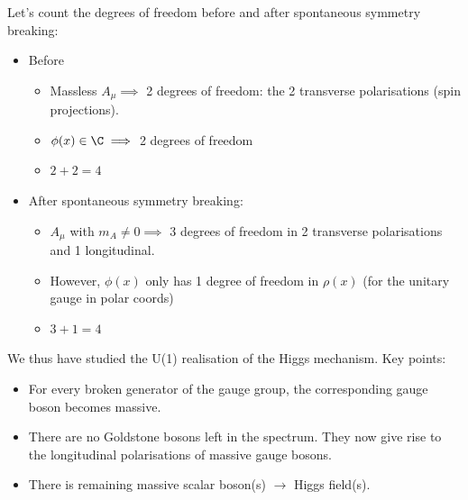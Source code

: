 \documentclass[a4paper, 11pt, normalem]{report}
\begin{document}
Let's count the degrees of freedom before and after spontaneous symmetry breaking:
\begin{itemize}
    \item Before
        \begin{itemize}
            \item Massless $A_\mu\implies$ 2 degrees of freedom: the 2 transverse polarisations (spin projections).
            \item $\phi(x)\in\C\implies$ 2 degrees of freedom
            \item $2+2=4$
        \end{itemize}
    \item After spontaneous symmetry breaking:
        \begin{itemize}
            \item $A_\mu$ with $m_A\neq0\implies$ 3 degrees of freedom in 2 transverse polarisations and 1 longitudinal.
            \item However, $\phi(x)$ only has 1 degree of freedom in $\rho(x)$ (for the unitary gauge in polar coords)
            \item $3+1=4$
        \end{itemize}
\end{itemize}
We thus have studied the U(1) realisation of the Higgs mechanism.
Key points:
\begin{itemize}
    \item For every broken generator of the gauge group, the corresponding gauge boson becomes massive.
    \item There are no Goldstone bosons left in the spectrum. They now give rise to the longitudinal polarisations of massive gauge bosons.
    \item There is remaining massive scalar boson(s) $\to$ Higgs field(s).
\end{itemize}
\end{document}

